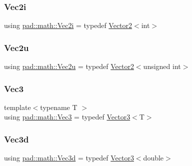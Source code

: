 \mbox{\label{namespacepad_1_1math_a808a631a6bccd994f9589d7fb86bad41}} 
\subsubsection{\texorpdfstring{Vec2i}{Vec2i}}
{\footnotesize\ttfamily using \mbox{\hyperlink{namespacepad_1_1math_a808a631a6bccd994f9589d7fb86bad41}{pad\+::math\+::\+Vec2i}} = typedef \mbox{\hyperlink{structpad_1_1math_1_1_vector2}{Vector2}}$<$int$>$}

\mbox{\label{namespacepad_1_1math_ab13dd37cee5ea5816af695f75c85f6c3}} 
\subsubsection{\texorpdfstring{Vec2u}{Vec2u}}
{\footnotesize\ttfamily using \mbox{\hyperlink{namespacepad_1_1math_ab13dd37cee5ea5816af695f75c85f6c3}{pad\+::math\+::\+Vec2u}} = typedef \mbox{\hyperlink{structpad_1_1math_1_1_vector2}{Vector2}}$<$unsigned int$>$}

\mbox{\label{namespacepad_1_1math_ad878ee274f48f47da283bb61ecef9f3d}} 
\subsubsection{\texorpdfstring{Vec3}{Vec3}}
{\footnotesize\ttfamily template$<$typename T $>$ \\
using \mbox{\hyperlink{namespacepad_1_1math_ad878ee274f48f47da283bb61ecef9f3d}{pad\+::math\+::\+Vec3}} = typedef \mbox{\hyperlink{structpad_1_1math_1_1_vector3}{Vector3}}$<$T$>$}

\mbox{\label{namespacepad_1_1math_ac1dd5a09fe437a7bd40f196b509932f2}} 
\subsubsection{\texorpdfstring{Vec3d}{Vec3d}}
{\footnotesize\ttfamily using \mbox{\hyperlink{namespacepad_1_1math_ac1dd5a09fe437a7bd40f196b509932f2}{pad\+::math\+::\+Vec3d}} = typedef \mbox{\hyperlink{structpad_1_1math_1_1_vector3}{Vector3}}$<$double$>$}

